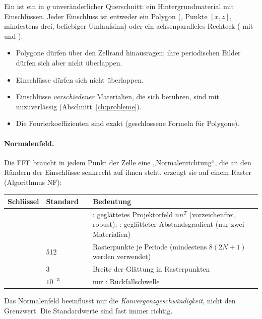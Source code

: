 Ein  ist ein in $y$ unveränderlicher Querschnitt: ein Hintergrundmaterial mit Einschlüssen. Jeder
Einschluss ist entweder ein Polygon (, Punkte $[x,z]$, mindestens drei, beliebiger Umlaufsinn)
oder ein achsenparalleles Rechteck ( mit  und ).
\begin{itemize}
  \item Polygone dürfen über den Zellrand hinausragen; ihre periodischen Bilder dürfen sich aber nicht überlappen.
  \item Einschlüsse dürfen sich nicht überlappen.
  \item Einschlüsse \emph{verschiedener} Materialien, die sich berühren, sind mit  unzuverlässig
        (Abschnitt~\ref{ch:probleme}).
  \item Die Fourierkoeffizienten sind exakt (geschlossene Formeln für Polygone).
\end{itemize}
\paragraph{Normalenfeld.} Die FFF braucht in jedem Punkt der Zelle eine „Normalenrichtung“, die an den Rändern der
Einschlüsse senkrecht auf ihnen steht. \FG{} erzeugt sie auf einem Raster (Algorithmus NF):
\begin{center}
\small
\begin{tabularx}{\linewidth}{lllY}
\toprule
Schlüssel & Standard & & Bedeutung \\
\midrule
{} &  & & : geglättetes Projektorfeld $nn^T$ (vorzeichenfrei, robust); :
geglätteter Abstandsgradient (nur zwei Materialien) \\
 & 512 & & Rasterpunkte je Periode (mindestens $8(2N+1)$ werden verwendet) \\
 & 3 & & Breite der Glättung in Rasterpunkten \\
 & $10^{-3}$ & & nur : Rückfallschwelle \\
\bottomrule
\end{tabularx}
\end{center}
Das Normalenfeld beeinflusst nur die \emph{Konvergenzgeschwindigkeit}, nicht den Grenzwert. Die Standardwerte
sind fast immer richtig.

